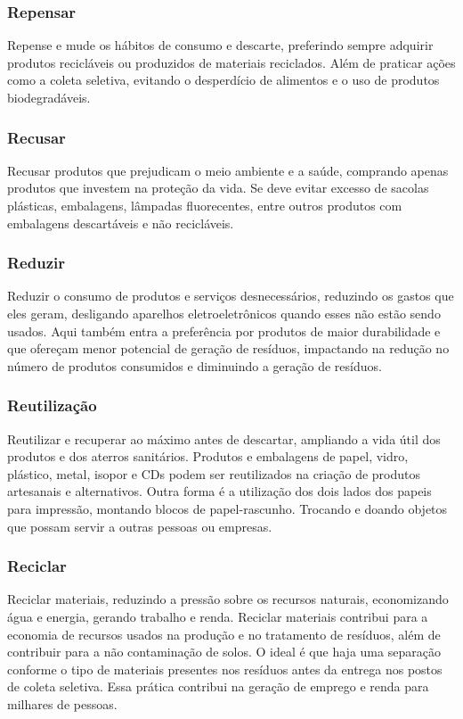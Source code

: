\subsubsection{Repensar}
Repense e mude os hábitos de consumo e descarte, preferindo sempre adquirir produtos recicláveis ou produzidos de materiais reciclados. Além de praticar ações como a coleta seletiva, evitando o desperdício de alimentos e o uso de produtos biodegradáveis.

\subsubsection{Recusar}
Recusar produtos que prejudicam o meio ambiente e a saúde, comprando apenas produtos que investem na proteção da vida. Se deve evitar excesso de sacolas plásticas, embalagens, lâmpadas fluorecentes, entre outros produtos com embalagens descartáveis e não recicláveis.

\subsubsection{Reduzir}
Reduzir o consumo de produtos e serviços desnecessários, reduzindo os gastos que eles geram, desligando aparelhos eletroeletrônicos quando esses não estão sendo usados. Aqui também entra a preferência por produtos de maior durabilidade e que ofereçam menor potencial de geração de resíduos, impactando na redução no número de produtos consumidos e diminuindo a geração de resíduos.

\subsubsection{Reutilização}
Reutilizar e recuperar ao máximo antes de descartar, ampliando a vida útil dos produtos e dos aterros sanitários. Produtos e embalagens de papel, vidro, plástico, metal, isopor e CDs podem ser reutilizados na criação de produtos artesanais e alternativos. Outra forma é a utilização dos dois lados dos papeis para impressão, montando blocos de papel-rascunho. Trocando e doando objetos que possam servir a outras pessoas ou empresas.

\subsubsection{Reciclar}
Reciclar materiais, reduzindo a pressão sobre os recursos naturais, economizando água e energia, gerando trabalho e renda.
Reciclar materiais contribui para a economia de recursos usados na produção e no tratamento de resíduos, além de contribuir para a não contaminação de solos. O ideal é que haja uma separação conforme o tipo de materiais presentes nos resíduos antes da entrega nos postos de coleta seletiva. Essa prática contribui na geração de emprego e renda para milhares de pessoas.

